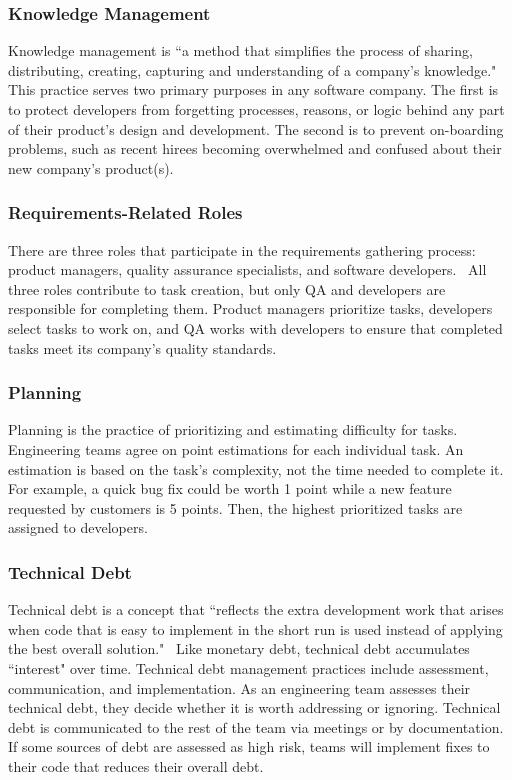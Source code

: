 \documentclass{sig-alternate}
\begin{document}
\subsubsection{Knowledge Management}
Knowledge management is ``a method that simplifies the process of sharing, distributing, creating, capturing and understanding of a company's knowledge."~\cite{Davenport:2000} This practice serves two primary purposes in any software company. The first is to protect developers from forgetting processes, reasons, or logic behind any part of their product's design and development. The second is to prevent on-boarding problems, such as recent hirees becoming overwhelmed and confused about their new company's product(s).

\subsubsection{Requirements-Related Roles}
There are three roles that participate in the requirements gathering process: product managers, quality assurance specialists, and software developers.~\cite{Gralha:2018} All three roles contribute to task creation, but only QA and developers are responsible for completing them. Product managers prioritize tasks, developers select tasks to work on, and QA works with developers to ensure that completed tasks meet its company's quality standards.

\subsubsection{Planning}
Planning is the practice of prioritizing and estimating difficulty for tasks. Engineering teams agree on point estimations for each individual task. An estimation is based on the task's complexity, not the time needed to complete it. For example, a quick bug fix could be worth 1 point while a new feature requested by customers is 5 points. Then, the highest prioritized tasks are assigned to developers.

\subsubsection{Technical Debt}
Technical debt is a concept that ``reflects the extra development work that arises when code that is easy to implement in the short run is used instead of applying the best overall solution."~\cite{Barrett:2018} Like monetary debt, technical debt accumulates ``interest" over time. Technical debt management practices include assessment, communication, and implementation. As an engineering team assesses their technical debt, they decide whether it is worth addressing or ignoring. Technical debt is communicated to the rest of the team via meetings or by documentation. If some sources of debt are assessed as high risk, teams will implement fixes to their code that reduces their overall debt.
\end{document}

